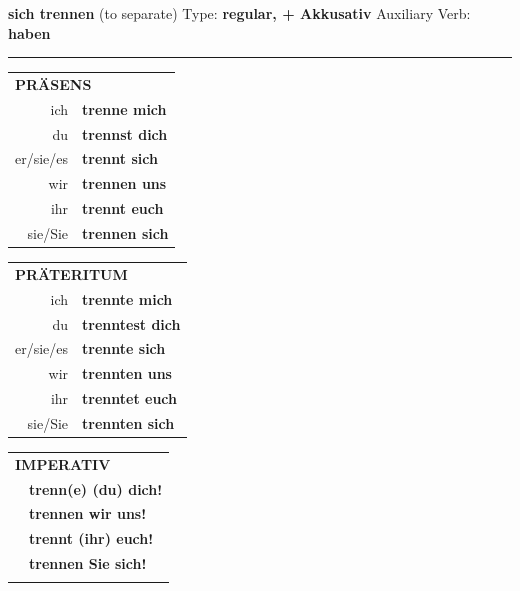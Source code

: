 \documentclass[10pt,a4paper]{revtex4-2}
\begin{document}
\begin{verbbox-acc}
        {\Large \bf sich trennen} (to separate) \hfill Type: \textbf{regular, + Akkusativ} \hfill Auxiliary Verb: \textbf{haben} 
    
       \vspace{5pt}

    \hrule
    
    \vspace{5pt}

  \begin{tabular}{rl}
     \multicolumn{2}{l}{\textbf{PRÄSENS} }\\
    ich & \textbf{trenne mich}\\
    du & \textbf{trennst dich}\\
    er/sie/es & \textbf{trennt sich}\\
    wir & \textbf{trennen uns}\\
    ihr & \textbf{trennt euch}\\
    sie/Sie & \textbf{trennen sich}\\
  \end{tabular}
  \hfill
     \begin{tabular}{rl}
    \multicolumn{2}{l}{\textbf{PRÄTERITUM} }\\
    ich & \textbf{trennte mich}\\
    du & \textbf{trenntest dich}\\
    er/sie/es & \textbf{trennte sich}\\
    wir & \textbf{trennten uns}\\
    ihr & \textbf{trenntet euch}\\
    sie/Sie & \textbf{trennten sich}\\
  \end{tabular}
  \hfill
  \begin{tabular}{rl}
     \multicolumn{2}{l}{\textbf{IMPERATIV} }\\
   & \textbf{trenn(e) (du) dich!}\\
   & \textbf{trennen wir uns!}\\
   & \textbf{trennt (ihr) euch!}\\
   & \textbf{trennen Sie sich!}\\
   & \vspace{10pt}
  \end{tabular}

    \vspace{10pt}


\end{verbbox-acc}
\end{document}
